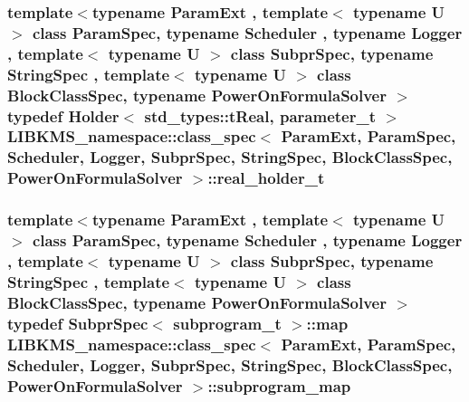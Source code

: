 \hypertarget{structLIBKMS__namespace_1_1class__spec_a324d4bf3c62975e268edcee0812ac738}{
\subsubsection[{real\-\_\-holder\-\_\-t}]{\setlength{\rightskip}{0pt plus 5cm}template$<$typename Param\-Ext , template$<$ typename U $>$ class Param\-Spec, typename Scheduler , typename Logger , template$<$ typename U $>$ class Subpr\-Spec, typename String\-Spec , template$<$ typename U $>$ class Block\-Class\-Spec, typename Power\-On\-Formula\-Solver $>$ typedef {\bf Holder}$<$ std\-\_\-types\-::t\-Real, {\bf parameter\-\_\-t} $>$ {\bf L\-I\-B\-K\-M\-S\-\_\-namespace\-::class\-\_\-spec}$<$ Param\-Ext, Param\-Spec, Scheduler, Logger, Subpr\-Spec, String\-Spec, Block\-Class\-Spec, Power\-On\-Formula\-Solver $>$\-::{\bf real\-\_\-holder\-\_\-t}}}\label{structLIBKMS__namespace_1_1class__spec_a324d4bf3c62975e268edcee0812ac738}
\hypertarget{structLIBKMS__namespace_1_1class__spec_a993880da2cc74bfdc8342f5bb95ed137}{
\subsubsection[{subprogram\-\_\-map}]{\setlength{\rightskip}{0pt plus 5cm}template$<$typename Param\-Ext , template$<$ typename U $>$ class Param\-Spec, typename Scheduler , typename Logger , template$<$ typename U $>$ class Subpr\-Spec, typename String\-Spec , template$<$ typename U $>$ class Block\-Class\-Spec, typename Power\-On\-Formula\-Solver $>$ typedef Subpr\-Spec$<$ {\bf subprogram\-\_\-t} $>$\-::map {\bf L\-I\-B\-K\-M\-S\-\_\-namespace\-::class\-\_\-spec}$<$ Param\-Ext, Param\-Spec, Scheduler, Logger, Subpr\-Spec, String\-Spec, Block\-Class\-Spec, Power\-On\-Formula\-Solver $>$\-::{\bf subprogram\-\_\-map}}}\label{structLIBKMS__namespace_1_1class__spec_a993880da2cc74bfdc8342f5bb95ed137}
